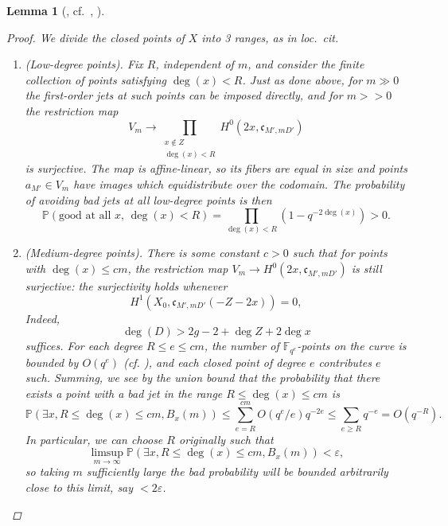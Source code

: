 \documentclass[openany]{amsbook}
\newtheorem{lemma}[theorem]{Lemma}
\theoremstyle{definition}
\theoremstyle{remark}
\numberwithin{equation}{section}
\newcommand{\F}{\mathbb{F}}
\renewcommand{\epsilon}{\varepsilon}
\renewcommand{\-}{\operatorname{-}}
\newcommand{\fc}{\mathfrak{c}}
\begin{document}
\begin{lemma}[{\cite[Proposition 5.1.1]{ngoetal}, cf.\ \cite[Theorem 1.2]{poonenbertini}, \cite[Theorem 8.1]{poonensquarefree}}]
\begin{proof}
        We divide the closed points of $X$ into 3 ranges, as in \textit{loc.\ cit.} \begin{enumerate}
            \item (Low-degree points). Fix $R$, independent of $m$, and consider the finite collection of points satisfying $\deg(x) < R$. Just as done above, for $m \gg 0$ the first-order jets at such points can be imposed directly, and for $m >> 0$ the restriction map
            $$
                V_m \to \prod_{\substack{x \not\in Z \\ \deg(x) < R}} H^0(2x, \fc_{M',mD'})
            $$
            is surjective. The map is affine-linear, so its fibers are equal in size and points $a_{M'} \in V_m$ have images which equidistribute over the codomain. The probability of avoiding bad jets at all low-degree points is then
            $$
                \mathbb{P}(\text{good at all $x$, $\deg(x) < R$}) = \prod_{\deg(x) < R} (1 - q^{-2 \deg(x)}) > 0.
            $$
            \item (Medium-degree points). There is some constant $c > 0$ such that for points with $\deg(x) \le cm$, the restriction map $V_m \to H^0(2x, \fc_{M', mD'})$ is still surjective: the surjectivity holds whenever
            $$
                H^1(X_0, \fc_{M', mD'}(-Z - 2x)) = 0,
            $$
            Indeed,
            $$
                \deg(D) > 2g - 2 + \deg Z + 2\deg x
            $$
            suffices. For each degree $R \le e \le cm$, the number of $\F_{q^e}$-points on the curve is bounded by $O(q^{e})$ (cf. \cite[Lemma 2.4]{poonenbertini}), and each closed point of degree $e$ contributes $e$ such. Summing, we see by the union bound that the probability that there exists a point with a bad jet in the range $R \le \deg(x) \le cm$ is
            $$
                \mathbb{P}(\exists x, R \le \deg(x) \le cm, B_x(m)) \le \sum_{e = R}^{cm} O(q^e/e) q^{-2e} \le \sum_{e \ge R} q^{-e} = O(q^{-R}).
            $$
            In particular, we can choose $R$ originally such that 
            $$
                \limsup_{m \to \infty} \mathbb{P}(\exists x, R \le \deg(x) \le cm, B_x(m)) < \epsilon,
            $$
            so taking $m$ sufficiently large the bad probability will be bounded arbitrarily close to this limit, say $< 2\epsilon$.


\end{enumerate}
\end{proof}
\end{lemma}
\end{document}
